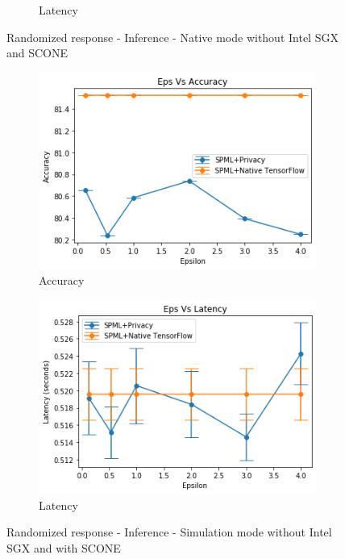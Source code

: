 \begin{figure}
\begin{subfigure}{0.5\textwidth}
         \caption{Latency}
         \label{fig:nativeRRLatencyInference}
     \end{subfigure}
        \caption{Randomized response - Inference - Native mode without Intel SGX and SCONE}
     \begin{subfigure}{0.5\textwidth}
         \includegraphics[width=\textwidth]{images/Inference/RRSIMAccuracy.png}
         \caption{Accuracy}
         \label{fig:simRRAccuracyInference}
     \end{subfigure}
     \begin{subfigure}{0.5\textwidth}
         \includegraphics[width=\textwidth]{images/Inference/RRSIMLatency.png}
         \caption{Latency}
         \label{fig:simRRLatencyInference}
     \end{subfigure}
        \caption{Randomized response - Inference - Simulation mode without Intel SGX and with SCONE}

\end{figure}

